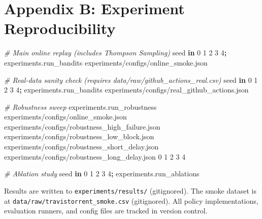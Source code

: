 \documentclass[10pt]{article}
\newenvironment{Shaded}{\begin{framed}}{\end{framed}}
\providecommand{\NormalTok}[1]{#1}
\providecommand{\KeywordTok}[1]{\textbf{#1}}
\providecommand{\CommentTok}[1]{\textit{#1}}
\begin{document}
\section{Appendix B: Experiment
Reproducibility}\label{appendix-b-experiment-reproducibility}

\begin{Shaded}
\begin{Highlighting}[]
\CommentTok{\# Main online replay (includes Thompson Sampling)}
\NormalTok{ seed }\KeywordTok{in}\NormalTok{ 0 1 2 3 4}\KeywordTok{;} 
     \NormalTok{ experiments.run\_bandits }\DataTypeTok{\textbackslash{}}
        \NormalTok{ experiments/configs/online\_smoke.json }\DataTypeTok{\textbackslash{}}
         

\CommentTok{\# Real{-}data sanity check (requires data/raw/github\_actions\_real.csv)}
\NormalTok{ seed }\KeywordTok{in}\NormalTok{ 0 1 2 3 4}\KeywordTok{;} 
     \NormalTok{ experiments.run\_bandits }\DataTypeTok{\textbackslash{}}
        \NormalTok{ experiments/configs/real\_github\_actions.json }\DataTypeTok{\textbackslash{}}
         

\CommentTok{\# Robustness sweep}
 \NormalTok{ experiments.run\_robustness }\DataTypeTok{\textbackslash{}}
    \NormalTok{ experiments/configs/online\_smoke.json }\DataTypeTok{\textbackslash{}}
\NormalTok{              experiments/configs/robustness\_high\_failure.json }\DataTypeTok{\textbackslash{}}
\NormalTok{              experiments/configs/robustness\_low\_block.json }\DataTypeTok{\textbackslash{}}
\NormalTok{              experiments/configs/robustness\_short\_delay.json }\DataTypeTok{\textbackslash{}}
\NormalTok{              experiments/configs/robustness\_long\_delay.json }\DataTypeTok{\textbackslash{}}
    \NormalTok{ 0 1 2 3 4}

\CommentTok{\# Ablation study}
\NormalTok{ seed }\KeywordTok{in}\NormalTok{ 0 1 2 3 4}\KeywordTok{;} 
     \NormalTok{ experiments.run\_ablations } 
\end{Highlighting}
\end{Shaded}

Results are written to \texttt{experiments/results/} (gitignored). The
smoke dataset is at \texttt{data/raw/travistorrent\_smoke.csv}
(gitignored). All policy implementations, evaluation runners, and config
files are tracked in version control.
\end{document}
